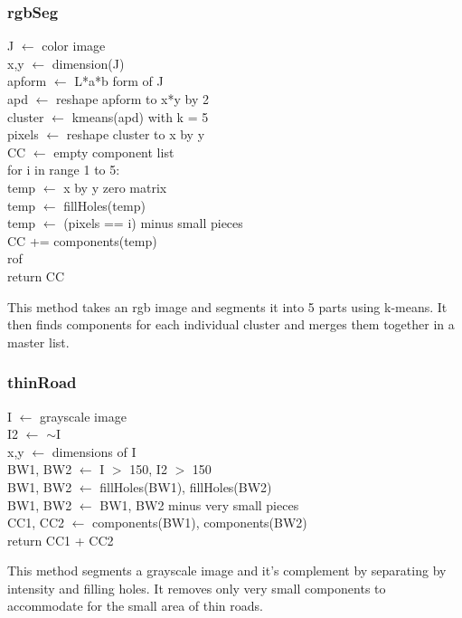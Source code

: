 \documentclass[12pt]{article}
\newcommand\tab[1][1cm]{\hspace*{#1}}
\begin{document}
\subsubsection*{rgbSeg}
\begin{addmargin}[12em]{1em}
	J $\leftarrow$ color image \\
	x,y $\leftarrow$ dimension(J) \\
	apform $\leftarrow$ L*a*b form of J \\
	apd $\leftarrow$ reshape apform to x*y by 2 \\
	cluster $\leftarrow$ kmeans(apd) with k = 5 \\
	pixels $\leftarrow$ reshape cluster to x by y \\
	CC $\leftarrow$ empty component list \\
	for i in range 1 to 5: \\
	\tab temp $\leftarrow$ x by y zero matrix \\
	\tab temp $\leftarrow$ fillHoles(temp) \\
	\tab temp $\leftarrow$ (pixels == i) minus small pieces \\
	\tab CC += components(temp) \\
	rof \\
	return CC \\
\end{addmargin}
This method takes an rgb image and segments it into 5 parts using k-means. It then finds components for each individual cluster and merges them together in a master list. 

\subsubsection*{thinRoad}
\begin{addmargin}[12em]{1em}
	I $\leftarrow$ grayscale image \\
	I2 $\leftarrow$ $\sim$I \\
	x,y $\leftarrow$ dimensions of I \\
	BW1, BW2 $\leftarrow$ I $>$ 150, I2 $>$ 150 \\
	BW1, BW2 $\leftarrow$ fillHoles(BW1), fillHoles(BW2) \\
	BW1, BW2 $\leftarrow$ BW1, BW2 minus very small pieces \\
	CC1, CC2 $\leftarrow$ components(BW1), components(BW2) \\
	return CC1 + CC2 \\
\end{addmargin}
This method segments a grayscale image and it's complement by separating by intensity and filling holes. It removes only very small components to accommodate for the small area of thin roads.
\end{document}
